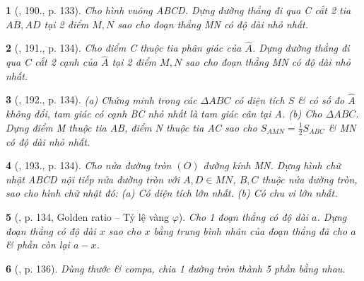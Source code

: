 \documentclass{article}
\newtheorem{baitoan}{}
\begin{document}
\begin{baitoan}[\cite{Binh_Toan_9_tap_1}, 190., p. 133]
	Cho hình vuông ABCD. Dựng đường thẳng đi qua C cắt 2 tia $AB,AD$ tại 2 điểm $M,N$ sao cho đoạn thẳng MN có độ dài nhỏ nhất.
\end{baitoan}

\begin{baitoan}[\cite{Binh_Toan_9_tap_1}, 191., p. 134]
	Cho điểm C thuộc tia phân giác của $\widehat{A}$. Dựng đường thẳng đi qua C cắt 2 cạnh của $\widehat{A}$ tại 2 điểm $M,N$ sao cho đoạn thẳng MN có độ dài nhỏ nhất.
\end{baitoan}

\begin{baitoan}[\cite{Binh_Toan_9_tap_1}, 192., p. 134]
	(a) Chứng minh trong các $\Delta ABC$ có diện tích $S$ \& có số đo $\widehat{A}$ không đổi, tam giác có cạnh BC nhỏ nhất là tam giác cân tại A. (b) Cho $\Delta ABC$. Dựng điểm M thuộc tia AB, điểm N thuộc tia AC sao cho $S_{AMN} = \frac{1}{2}S_{ABC}$  \& MN có độ dài nhỏ nhất.
\end{baitoan}

\begin{baitoan}[\cite{Binh_Toan_9_tap_1}, 193., p. 134]
	Cho nửa đường tròn $(O)$ đường kính MN. Dựng hình chữ nhật ABCD nội tiếp nửa đường tròn với $A,D\in MN$, $B,C$ thuộc nửa đường tròn, sao cho hình chữ nhật đó: (a) Có diện tích lớn nhất. (b) Có chu vi lớn nhất.
\end{baitoan}

\begin{baitoan}[\cite{Binh_Toan_9_tap_1}, p. 134, Golden ratio -- Tỷ lệ vàng $\varphi$]
	Cho 1 đoạn thẳng có độ dài $a$. Dựng đoạn thẳng có độ dài $x$ sao cho $x$ bằng trung bình nhân của đoạn thẳng đã cho $a$ \& phần còn lại $a - x$.
\end{baitoan}

\begin{baitoan}[\cite{Binh_Toan_9_tap_1}, p. 136]
	Dùng thước \& compa, chia 1 đường tròn thành 5 phần bằng nhau.
\end{baitoan}

\end{document}
